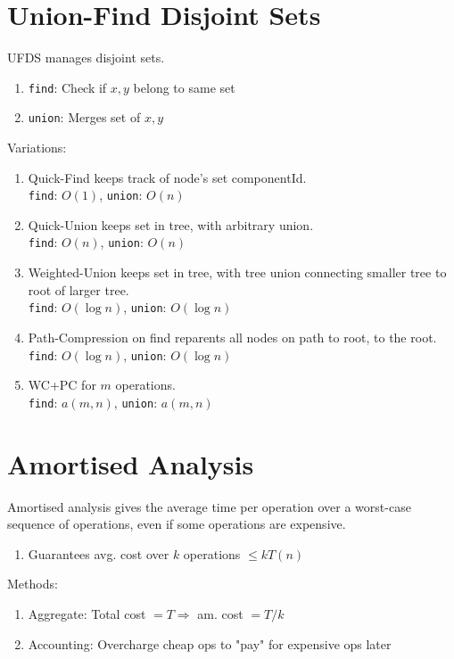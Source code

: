 \documentclass[12pt, a4paper]{article}
\begin{document}
\begin{multicols*}{3}
\colbreak
\section{Union-Find Disjoint Sets}

UFDS manages disjoint sets.
\begin{enumerate}[\roman*.]
  \item \lstinline|find|: Check if $x, y$ belong to same set
  \item \lstinline|union|: Merges set of $x, y$
\end{enumerate}

Variations:
\begin{enumerate}[\roman*.]
  \item Quick-Find keeps track of node's set componentId.\\
    \lstinline|find|: $O(1)$, \lstinline|union|: $O(n)$
  \item Quick-Union keeps set in tree, with arbitrary union.\\
    \lstinline|find|: $O(n)$, \lstinline|union|: $O(n)$
  \item Weighted-Union keeps set in tree, with tree union connecting smaller tree to root of larger tree.\\
    \lstinline|find|: $O(\log n)$, \lstinline|union|: $O(\log n)$
  \item Path-Compression on find reparents all nodes on path to root, to the root.\\
    \lstinline|find|: $O(\log n)$, \lstinline|union|: $O(\log n)$
  \item WC+PC for $m$ operations.\\
    \lstinline|find|: $a(m, n)$, \lstinline|union|: $a(m, n)$
\end{enumerate}

\section{Amortised Analysis}
Amortised analysis gives the average time per operation over a worst-case sequence of operations, even if some operations are expensive.
\begin{enumerate}[\roman*.]
  \item Guarantees avg. cost over $k$ operations $\leq k T(n)$
\end{enumerate}

Methods:
\begin{enumerate}[\roman*.]
  \item Aggregate: Total cost $= T \Rightarrow$ am. cost $= T/k$
  \item Accounting: Overcharge cheap ops to "pay" for expensive ops later
\end{enumerate}


\end{multicols*}
\end{document}
